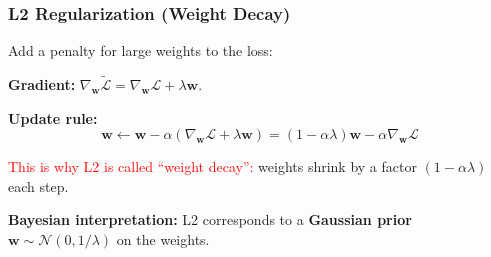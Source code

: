 \documentclass[notes,11pt, aspectratio=169]{beamer}
\newcommand{\vw}{\mathbf{w}}
\begin{document}
\begin{frame}
\frametitle{L2 Regularization (Weight Decay)}

Add a penalty for large weights to the loss:


\vspace{6pt}
\textbf{Gradient:} $\nabla_{\vw} \tilde{\mathcal{L}} = \nabla_{\vw}\mathcal{L} + \lambda \vw$.

\textbf{Update rule:}
\[
    \vw \leftarrow \vw - \alpha (\nabla_{\vw}\mathcal{L} + \lambda \vw) = (1 - \alpha\lambda) \vw - \alpha \nabla_{\vw}\mathcal{L}
\]

\textcolor{red}{This is why L2 is called ``weight decay'':} weights shrink by a factor $(1 - \alpha\lambda)$ each step.

\vspace{4pt}
\textbf{Bayesian interpretation:} L2 corresponds to a \textbf{Gaussian prior} $\vw \sim \mathcal{N}(0, 1/\lambda)$ on the weights.
\end{frame}
\end{document}
